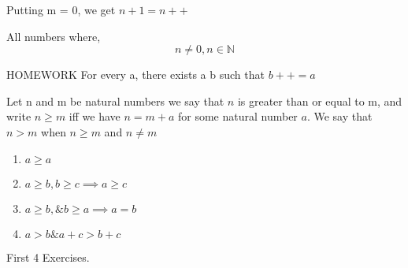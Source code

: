 \documentclass[11pt]{report}
\begin{document}
Putting m = 0, we get \(n+1 = n++\)
\begin{definition}
All numbers where,
\[
n \neq 0, n \in \mathbb{N}
\]
\end{definition}

\begin{lemma}HOMEWORK
For every a, there exists a b such that $b++ = a$
\end{lemma}
\begin{definition}[Order]
Let n and m be natural numbers we say that $n$ is greater than or equal to m, and write $n \geq m$ iff we have $n = m + a$ for some natural number $a$. We say that $n > m$ when $n \geq m$ and $n \neq m$
\end{definition}

\begin{enumerate}
\item $a \geq a$
\item $a \geq b, b \geq c \implies a \geq c$
\item $a \geq b, \& b \geq a \implies a = b$
\item $a > b \& a + c > b + c$
\end{enumerate}

First 4 Exercises.
\end{document}
